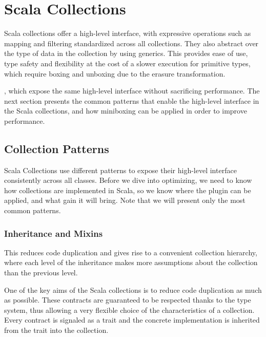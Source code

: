 \section{Scala Collections}

 Scala collections offer a high-level interface, with expressive operations such as mapping and filtering standardized across all collections. They also abstract over the type of data in the collection by using generics. This provides ease of use, type safety and flexibility at the cost of a slower execution for primitive types, which require boxing and unboxing due to the erasure transformation.

, which expose the same high-level interface without sacrificing performance. The next section presents the common patterns that enable the high-level interface in the Scala collections, and how miniboxing can be applied in order to improve performance.

\subsection{Collection Patterns}

Scala Collections use different patterns to expose their high-level interface consistently across all classes. Before we dive into optimizing, we need to know how collections are implemented in Scala, so we know where the plugin can be applied, and what gain it will bring. Note that we will present only the most common patterns.

\subsubsection{Inheritance and Mixins}

 This reduces code duplication and gives rise to a convenient collection hierarchy, where each level of the inheritance makes more assumptions about the collection than the previous level.

One of the key aims of the Scala collections is to reduce code duplication as much as possible.  These contracts are guaranteed to be respected thanks to the type system, thus allowing a very flexible choice of the characteristics of a collection. Every contract is signaled as a trait and the concrete implementation is inherited from the trait into the collection.

